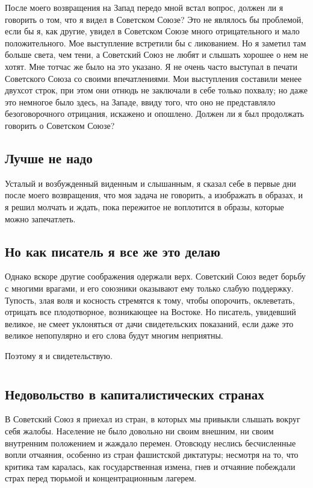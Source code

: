 \documentclass[12pt, a4paper, openany]{book}
\begin{document}
После моего возвращения на Запад передо мной встал вопрос, должен ли я говорить о том, что я видел в Советском Союзе? Это не являлось бы проблемой, если бы я, как другие, увидел в Советском Союзе много отрицательного и мало положительного. Мое выступление встретили бы с ликованием. Но я заметил там больше света, чем тени, а Советский Союз не любят и слышать хорошее о нем не хотят. Мне тотчас же было на это указано. Я не очень часто выступал в печати Советского Союза со своими впечатлениями. Мои выступления составили менее двухсот строк, при этом они отнюдь не заключали в себе только похвалу; но даже это немногое было здесь, на Западе, ввиду того, что оно не представляло безоговорочного отрицания, искажено и опошлено. Должен ли я был продолжать говорить о Советском Союзе?

\subsection*{Лучше не надо}

Усталый и возбужденный виденным и слышанным, я сказал себе в первые дни после моего возвращения, что моя задача не говорить, а изображать в образах, и я решил молчать и ждать, пока пережитое не воплотится в образы, которые можно запечатлеть.

\subsection*{Но как писатель я все же это делаю}

Однако вскоре другие соображения одержали верх. Советский Союз ведет борьбу с многими врагами, и его союзники оказывают ему только слабую поддержку. Тупость, злая воля и косность стремятся к тому, чтобы опорочить, оклеветать, отрицать все плодотворное, возникающее на Востоке. Но писатель, увидевший великое, не смеет уклоняться от дачи свидетельских показаний, если даже это великое непопулярно и его слова будут многим неприятны.

Поэтому я и свидетельствую.

\newpage

\section[Глава I. Будни и праздники]{}
\subsection*{Недовольство в капиталистических странах}
В Советский Союз я приехал из стран, в которых мы привыкли слышать вокруг себя жалобы. Население не было довольно ни своим внешним, ни своим внутренним положением и жаждало перемен. Отовсюду неслись бесчисленные вопли отчаяния, особенно из стран фашистской диктатуры; несмотря на то, что критика там каралась, как государственная измена, гнев и отчаяние побеждали страх перед тюрьмой и концентрационным лагерем.
\end{document}
